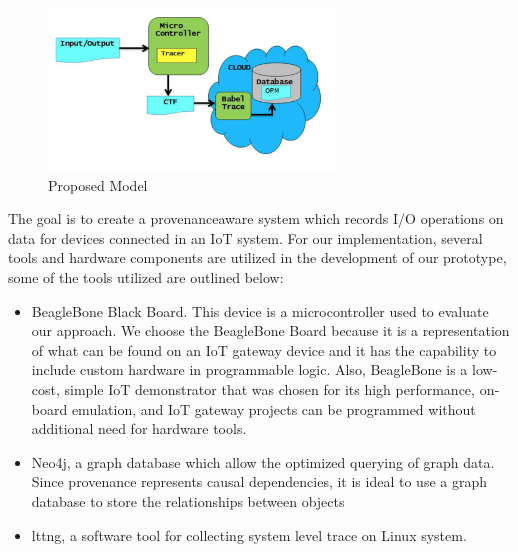 \begin{figure}[h]
\begin{center}

\includegraphics[width =3.0in]{architecture.PNG}    
\end{center}
\caption{Proposed Model}
\label{autom}
\end{figure}

The goal is to create a provenance\-aware system which records I/O operations on data for devices connected in an IoT system. For our implementation, several tools and hardware components are utilized in the development of our prototype, some of the tools utilized are outlined below:

\begin{itemize}
\item BeagleBone Black Board. This device is a microcontroller used to evaluate our approach. We choose the BeagleBone Board because it is a representation of what can be found on an IoT gateway device and it has the capability to include custom hardware in programmable logic. Also, BeagleBone is a low­cost, simple IoT demonstrator that was chosen for its high­ performance, on­board emulation, and IoT gateway projects can be programmed without additional need for hardware tools.


\item Neo4j, a graph database which allow the optimized querying of graph data. Since provenance represents causal dependencies, it is ideal to use a graph database to store the relationships between objects

\item lttng, a software tool for collecting system level trace on Linux system. 

\end{itemize}


